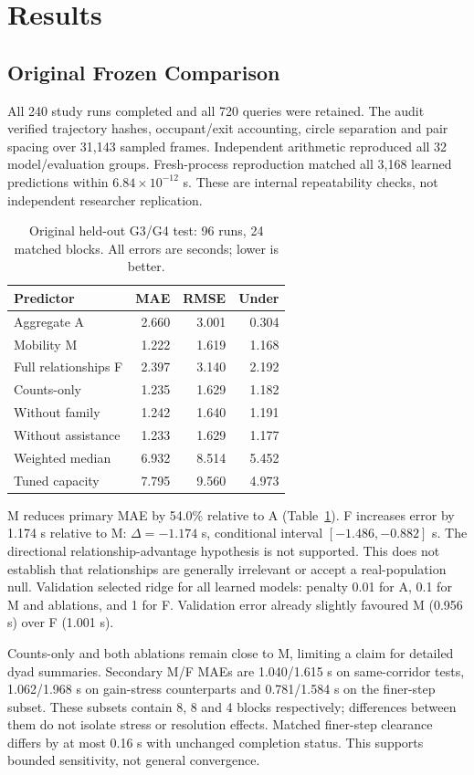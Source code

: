 \documentclass[conference]{IEEEtran}
\begin{document}
\section{Results}
\subsection{Original Frozen Comparison}
All 240 study runs completed and all 720 queries were retained. The audit verified trajectory hashes, occupant/exit accounting, circle separation and pair spacing over 31,143 sampled frames. Independent arithmetic reproduced all 32 model/evaluation groups. Fresh-process reproduction matched all 3,168 learned predictions within $6.84\times10^{-12}$ s. These are internal repeatability checks, not independent researcher replication.

\begin{table}[!t]\centering\small
\caption{Original held-out G3/G4 test: 96 runs, 24 matched blocks. All errors are seconds; lower is better.}
\label{tab:primary}
\begin{tabular}{lrrr}\toprule Predictor & MAE & RMSE & Under\\\midrule
Aggregate A & 2.660 & 3.001 & 0.304\\
Mobility M & 1.222 & 1.619 & 1.168\\
Full relationships F & 2.397 & 3.140 & 2.192\\
Counts-only & 1.235 & 1.629 & 1.182\\
Without family & 1.242 & 1.640 & 1.191\\
Without assistance & 1.233 & 1.629 & 1.177\\
Weighted median & 6.932 & 8.514 & 5.452\\
Tuned capacity & 7.795 & 9.560 & 4.973\\\bottomrule
\end{tabular}
\end{table}

M reduces primary MAE by 54.0\% relative to A (Table~\ref{tab:primary}). F increases error by 1.174 s relative to M: $\Delta=-1.174$ s, conditional interval $[-1.486,-0.882]$ s. The directional relationship-advantage hypothesis is not supported. This does not establish that relationships are generally irrelevant or accept a real-population null. Validation selected ridge for all learned models: penalty 0.01 for A, 0.1 for M and ablations, and 1 for F. Validation error already slightly favoured M (0.956 s) over F (1.001 s).

Counts-only and both ablations remain close to M, limiting a claim for detailed dyad summaries. Secondary M/F MAEs are 1.040/1.615 s on same-corridor tests, 1.062/1.968 s on gain-stress counterparts and 0.781/1.584 s on the finer-step subset. These subsets contain 8, 8 and 4 blocks respectively; differences between them do not isolate stress or resolution effects. Matched finer-step clearance differs by at most 0.16 s with unchanged completion status. This supports bounded sensitivity, not general convergence.
\end{document}
